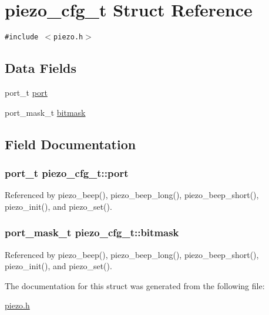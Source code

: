 \hypertarget{structpiezo__cfg__t}{
\section{piezo\_\-cfg\_\-t Struct Reference}
\label{structpiezo__cfg__t}
}
{\tt \#include $<$piezo.h$>$}

\subsection*{Data Fields}
\begin{CompactItemize}
\item 
port\_\-t \hyperlink{structpiezo__cfg__t_8da238bcc277fa0c96394fcc8141f30f}{port}
\item 
port\_\-mask\_\-t \hyperlink{structpiezo__cfg__t_ae6e3f15eaf446736516c813001d9e77}{bitmask}
\end{CompactItemize}


\subsection{Field Documentation}
\hypertarget{structpiezo__cfg__t_8da238bcc277fa0c96394fcc8141f30f}{
\subsubsection{\setlength{\rightskip}{0pt plus 5cm}port\_\-t {\bf piezo\_\-cfg\_\-t::port}}}
\label{structpiezo__cfg__t_8da238bcc277fa0c96394fcc8141f30f}




Referenced by piezo\_\-beep(), piezo\_\-beep\_\-long(), piezo\_\-beep\_\-short(), piezo\_\-init(), and piezo\_\-set().\hypertarget{structpiezo__cfg__t_ae6e3f15eaf446736516c813001d9e77}{
\subsubsection{\setlength{\rightskip}{0pt plus 5cm}port\_\-mask\_\-t {\bf piezo\_\-cfg\_\-t::bitmask}}}
\label{structpiezo__cfg__t_ae6e3f15eaf446736516c813001d9e77}




Referenced by piezo\_\-beep(), piezo\_\-beep\_\-long(), piezo\_\-beep\_\-short(), piezo\_\-init(), and piezo\_\-set().

The documentation for this struct was generated from the following file:\begin{CompactItemize}
\item 
\hyperlink{piezo_8h}{piezo.h}\end{CompactItemize}
